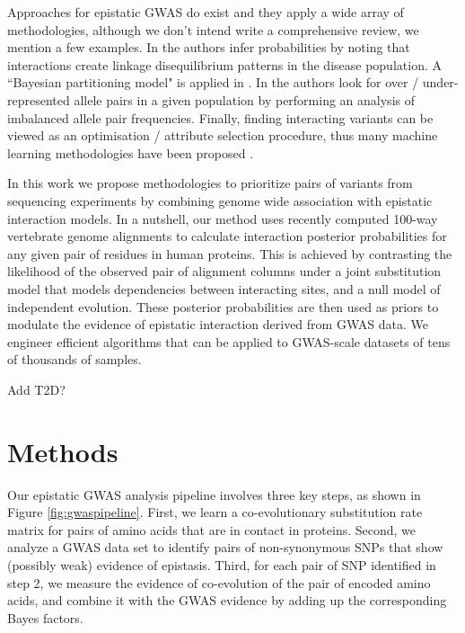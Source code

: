 Approaches for epistatic GWAS do exist and they apply a wide array of methodologies, although we don't intend write a comprehensive review, we mention a few examples. In \cite{zhao2006test} the authors infer probabilities by noting that interactions create linkage disequilibrium patterns in the disease population. A “Bayesian partitioning model" is applied in \cite{zhang2007bayesian}. In \cite{ackermann2012systematic} the authors look for over / under-represented allele pairs in a given population by performing an analysis of imbalanced allele pair frequencies. Finally, finding interacting variants can be viewed as an optimisation / attribute selection procedure, thus many machine learning methodologies have been proposed \cite{mckinney2006machine}.

In this work we propose methodologies to prioritize pairs of variants from sequencing experiments by combining genome wide association with epistatic interaction models. In a nutshell, our method uses recently computed 100-way vertebrate genome alignments to calculate interaction posterior probabilities for any given pair of residues in human proteins. This is achieved by contrasting the likelihood of the observed pair of alignment columns under a joint substitution model that models dependencies between interacting sites, and a null model of independent evolution.  These posterior probabilities are then used as priors to modulate the evidence of epistatic interaction derived from GWAS data. We engineer efficient algorithms that can be applied to GWAS-scale datasets of tens of thousands of samples.

{\huge Add T2D?}

\section{Methods}

Our epistatic GWAS analysis pipeline involves three key steps, as shown in Figure \ref{fig:gwaspipeline}. First, we learn a co-evolutionary substitution rate matrix for pairs of amino acids that are in contact in proteins. Second, we analyze a GWAS data set to identify pairs of non-synonymous SNPs that show (possibly weak) evidence of epistasis. Third, for each pair of SNP identified in step 2, we measure the evidence of co-evolution of the pair of encoded amino acids, and combine it with the GWAS evidence by adding up the corresponding Bayes factors.


